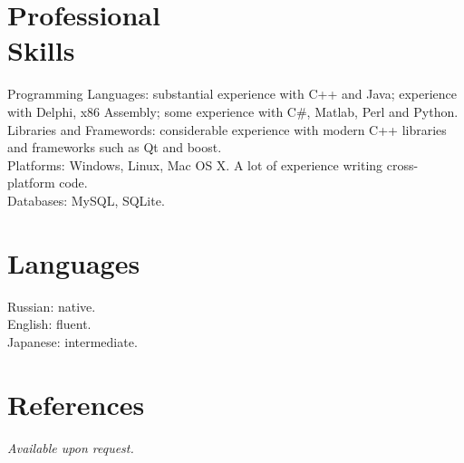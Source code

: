 \documentclass[margin,line]{CV}
\begin{document}
\begin{resume}
    \section{\mysidestyle Professional\\Skills}
    Programming Languages: substantial experience with C++ and Java; experience with Delphi, x86 Assembly; some experience with C\#, Matlab, Perl and Python. \\
    Libraries and Framewords: considerable experience with modern C++ libraries and frameworks such as Qt and boost. \\
    Platforms: Windows, Linux, Mac OS X. A lot of experience writing cross-platform code. \\
    Databases: MySQL, SQLite.

    \section{\mysidestyle Languages}
    Russian: native. \\
    English: fluent. \\
    Japanese: intermediate.

    \section{\mysidestyle References}
    {\sl Available upon request.}

\end{resume}
\end{document}
